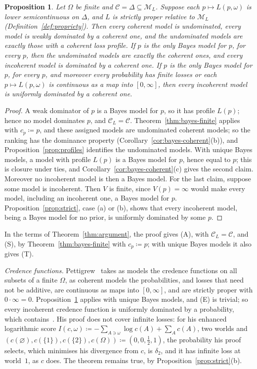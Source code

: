 \documentclass[11pt]{article}
\newtheorem{proposition}[theorem]{Proposition}
\theoremstyle{definition}
\theoremstyle{remark}
\newcommand{\M}{\mathcal M}
\newcommand{\C}{\mathcal C}
\begin{document}
\begin{proposition}\label{prop:proper}
Let $\Omega$ be finite and $\C=\Delta\subseteq\M_L$. Suppose each $p\mapsto L(p,\omega)$ is lower semicontinuous on $\Delta$, and $L$ is strictly proper relative to $\M_L$ (Definition~\ref{def:propriety}). Then every coherent model is undominated, every model is weakly dominated by a coherent one, and the undominated models are exactly those with a coherent loss profile. If $p$ is the only Bayes model for $p$, for every $p$, then the undominated models are exactly the coherent ones, and every incoherent model is dominated by a coherent one. If $p$ is the only Bayes model for $p$, for every $p$, and moreover every probability has finite losses or each $p\mapsto L(p,\omega)$ is continuous as a map into $[0,\infty]$, then every incoherent model is uniformly dominated by a coherent one.
\end{proposition}
\begin{proof}
A weak dominator of $p$ is a Bayes model for $p$, so it has profile $L(p)$; hence no model dominates $p$, and $\C_L=\C$. Theorem~\ref{thm:bayes-finite} applies with $c_p\coloneqq p$, and these assigned models are undominated coherent models; so the ranking has the dominance property (Corollary~\ref{cor:bayes-coherent}(b)), and Proposition~\ref{prop:profiles} identifies the undominated models. With unique Bayes models, a model with profile $L(p)$ is a Bayes model for $p$, hence equal to $p$; this is closure under ties, and Corollary~\ref{cor:bayes-coherent}(c) gives the second claim. Moreover no incoherent model is then a Bayes model. For the last claim, suppose some model is incoherent. Then $V$ is finite, since $V(p)=\infty$ would make every model, including an incoherent one, a Bayes model for $p$. Proposition~\ref{prop:strict}, case (a) or (b), shows that every incoherent model, being a Bayes model for no prior, is uniformly dominated by some $p$.
\end{proof}

In the terms of Theorem~\ref{thm:argument}, the proof gives (A), with $\C_L=\C$, and (S), by Theorem~\ref{thm:bayes-finite} with $c_p\coloneqq p$; with unique Bayes models it also gives (T).

\emph{Credence functions.} Pettigrew~\cite{Pettigrew} takes as models the credence functions on all subsets of a finite $\Omega$, as coherent models the probabilities, and losses that need not be additive, are continuous as maps into $[0,\infty]$, and are strictly proper with $0\cdot\infty=0$. Proposition~\ref{prop:proper} applies with unique Bayes models, and (E) is trivial; so every incoherent credence function is uniformly dominated by a probability, which contains~\cite[Theorem~1]{Pettigrew}. His proof does not cover infinite losses: for his enhanced logarithmic score $I(c,\omega)\coloneqq-\sum_{A\ni\omega}\log c(A)+\sum_Ac(A)$, two worlds and $(c(\varnothing),c(\{1\}),c(\{2\}),c(\Omega))\coloneqq(0,0,\frac12,1)$, the probability his proof selects, which minimises his divergence from $c$, is $\delta_2$, and it has infinite loss at world~$1$, as $c$ does. The theorem remains true, by Proposition~\ref{prop:strict}(b).
\end{document}
